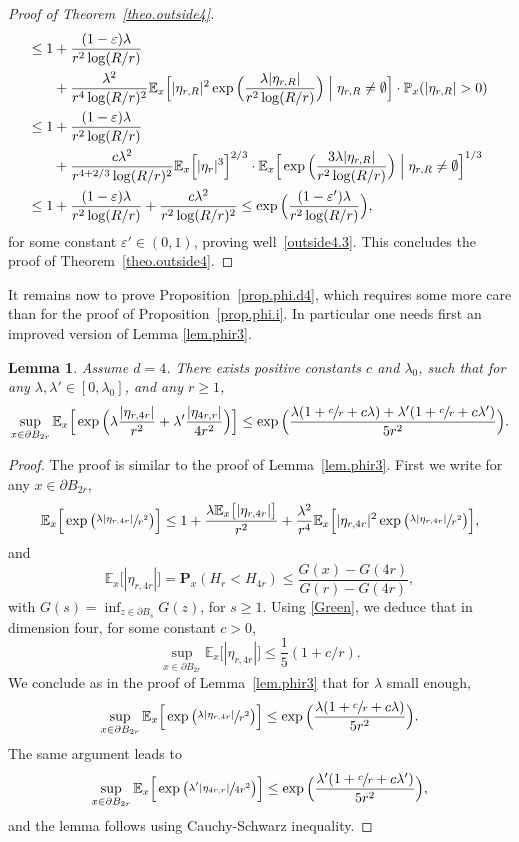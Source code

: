 \documentclass[11pt]{article}
\numberwithin{equation}{section}
\theoremstyle{plain}
\newtheorem{lemma}[theorem]{Lemma}
\theoremstyle{definition}
\newcommand{\1}{{\text{\Large $\mathfrak 1$}}}
\begin{document}
\begin{proof}[Proof of Theorem~\ref{theo.outside4}]
\begin{align*}
\le 1&+\frac{(1-\varepsilon)\lambda}{r^2\log(R/r)}\\
&+ \frac{\lambda^2}{r^4\log(R/r)^2}
\mathbb E_x\Big[|\eta_{r,R}|^2\exp\Big(\frac{\lambda|\eta_{r,R}|}{r^2\log(R/r)}\Big)\Bigm| \eta_{r,R}\neq \emptyset\Big]\cdot \mathbb P_x(|\eta_{r,R}|>0) \\
\le 1&+\frac{(1-\varepsilon)\lambda}{r^2\log(R/r)}\\
&+ \frac{c\lambda^2}{r^{4+2/3}\log(R/r)^2}
\mathbb E_x\Big[|\eta_r|^3\Big]^{2/3} \cdot
\mathbb E_x\Big[\exp\Big(\frac{3\lambda|\eta_{r,R}|}{r^2\log(R/r)}\Big)\Bigm| \eta_{r,R}\neq \emptyset\Big]^{1/3}\\
\le 1&+\frac{(1-\varepsilon)\lambda}{r^2\log(R/r)} + \frac{c\lambda^2}{r^2\log(R/r)^2}\le \exp\Big(\frac{(1-\varepsilon')\lambda}{r^2\log (R/r)}\Big),
\end{align*}
for some constant $\varepsilon'\in(0,1)$, proving well~\eqref{outside4.3}. This concludes the proof of Theorem~\ref{theo.outside4}.
\end{proof}
It remains now to prove Proposition~\ref{prop.phi.d4}, which requires some more care than for the proof of Proposition~\ref{prop.phi.i}.
In particular one needs first an improved version of Lemma \ref{lem.phir3}.

\begin{lemma}\label{lem.phir4}
Assume $d=4$. There exists positive constants $c$ and $\lambda_0$, such that for any $\lambda, \lambda'\in[0,\lambda_0]$, and any $r\ge 1$,
\[
\sup_{x\in \partial B_{2r}} \mathbb E_x \Big[\exp\Big(\lambda\frac{|\eta_{r,4r}|}{r^2} +
\lambda' \frac{|\eta_{4r,r}|}{4r^2}\Big)\Big] \le \exp\Big(\frac{\lambda(1+\sfrac{c}{r}+c\lambda)+ \lambda'(1+\sfrac{c}{r}+c\lambda')}{5r^2}\Big).
\]
\end{lemma}
\begin{proof}
The proof is similar to the proof of Lemma~\ref{lem.phir3}. First we write for any $x\in \partial B_{2r}$,
\[
\mathbb E_x\Big[\exp\big(\sfrac{\lambda |\eta_{r,4r}|}{r^2}\big)\Big] \le 1+ \frac{\lambda \mathbb E_x\big[|\eta_{r,4r}|\big]}{r^2} +
\frac{\lambda^2}{r^4} \mathbb E_x\Big[|\eta_{r,4r}|^2\exp\big(\sfrac{\lambda |\eta_{r,4r}|}{r^2}\big)\Big],
\]
and
\[
\mathbb E_x\big[|\eta_{r,4r}|\big] = \mathbf P_x(H_r<H_{4r}) \le \frac{G(x) - G(4r)}{G(r)- G(4r)},
\]
with $G(s)= \inf_{z\in \partial B_s} G(z)$, for $s\ge 1$. Using \eqref{Green}, we deduce that in dimension four, for some constant $c>0$,
\[
\sup_{x\in \partial B_{2r}} \mathbb E_x\big[|\eta_{r,4r}|\big] \le \frac{1}{5} (1+ c/r).
\]
We conclude as in the proof of Lemma~\ref{lem.phir3} that for $\lambda$ small enough,
\[
\sup_{x\in \partial B_{2r}} \mathbb E_x\Big[\exp\big(\sfrac{\lambda |\eta_{r,4r}|}{r^2}\big)\Big] \le \exp\Big(\frac{\lambda(1+\sfrac{c}{r}+c\lambda)}{5r^2}\Big).
\]
The same argument leads to
\[
\sup_{x\in \partial B_{2r}} \mathbb E_x\Big[\exp\big(\sfrac{\lambda' |\eta_{4r,r}|}{4r^2}\big)\Big] \le \exp\Big(\frac{\lambda'(1+\sfrac{c}{r}+c\lambda')}{5r^2}\Big),
\]
and the lemma follows using Cauchy-Schwarz inequality.
\end{proof}
\end{document}
